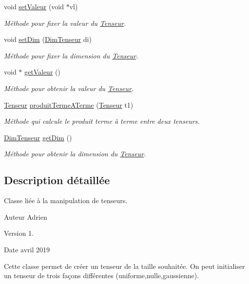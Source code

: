 \begin{DoxyCompactItemize}
void \hyperlink{classTenseur_add5cd51caa3aae69a44dc3f0bc2b9170}{set\+Valeur} (void $\ast$vl)
\begin{DoxyCompactList}\small\item\em Méthode pour fixer la valeur du \hyperlink{classTenseur}{Tenseur}. \end{DoxyCompactList}\item 
void \hyperlink{classTenseur_a161be386a5d179f538234fceb152e80a}{set\+Dim} (\hyperlink{classDimTenseur}{Dim\+Tenseur} di)
\begin{DoxyCompactList}\small\item\em Méthode pour fixer la dimension du \hyperlink{classTenseur}{Tenseur}. \end{DoxyCompactList}\item 
void $\ast$ \hyperlink{classTenseur_abf24ad6abb135909d0ec82142da47188}{get\+Valeur} ()
\begin{DoxyCompactList}\small\item\em Méthode pour obtenir la valeur du \hyperlink{classTenseur}{Tenseur}. \end{DoxyCompactList}\item 
\hyperlink{classTenseur}{Tenseur} \hyperlink{classTenseur_a616b8fc8cfee2c3f601c567ba42c7422}{produit\+Terme\+A\+Terme} (\hyperlink{classTenseur}{Tenseur} t1)
\begin{DoxyCompactList}\small\item\em Méthode qui calcule le produit terme à terme entre deux tenseurs. \end{DoxyCompactList}\item 
\hyperlink{classDimTenseur}{Dim\+Tenseur} \hyperlink{classTenseur_a84d2bb71deb6f4998327f6c9309c1ed4}{get\+Dim} ()
\begin{DoxyCompactList}\small\item\em Méthode pour obtenir la dimension du \hyperlink{classTenseur}{Tenseur}. \end{DoxyCompactList}\end{DoxyCompactItemize}


\subsection{Description détaillée}
Classe liée à la manipulation de tenseurs. 

\begin{DoxyAuthor}{Auteur}
Adrien 
\end{DoxyAuthor}
\begin{DoxyVersion}{Version}
1. 
\end{DoxyVersion}
\begin{DoxyDate}{Date}
avril 2019
\end{DoxyDate}
Cette classe permet de créer un tenseur de la taille souhaitée. On peut initialiser un tenseur de trois façons différentes (uniforme,nulle,gaussienne). 

